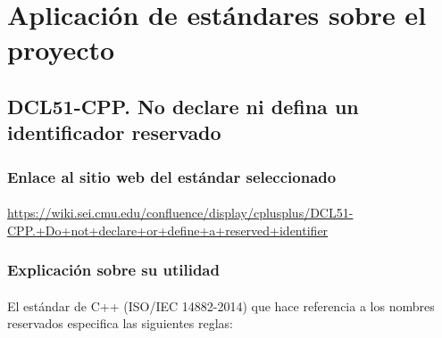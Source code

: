 \section{Aplicación de estándares sobre el proyecto}

	\subsection{DCL51-CPP. No declare ni defina un identificador reservado}

		\subsubsection{Enlace al sitio web del estándar seleccionado}
		
			\paragraph{}\url{https://wiki.sei.cmu.edu/confluence/display/cplusplus/DCL51-CPP.+Do+not+declare+or+define+a+reserved+identifier}
		
		\subsubsection{Explicación sobre su utilidad}
		
			\paragraph{}El estándar de C++ (ISO/IEC 14882-2014) que hace referencia a los nombres reservados especifica las siguientes reglas:
			
